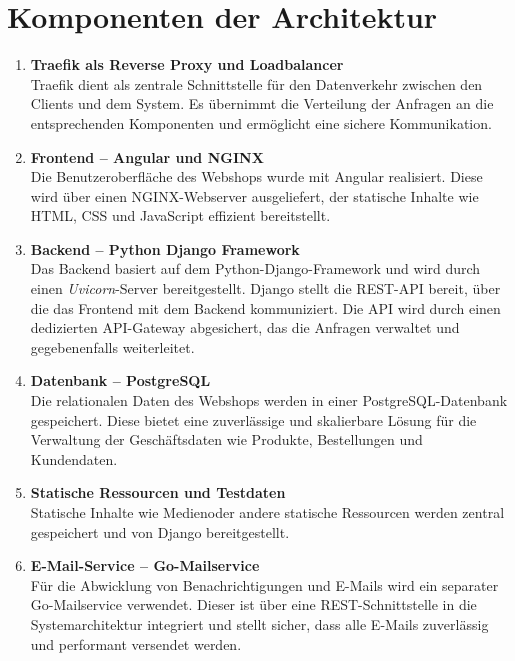 \documentclass[%
	12pt,
	a4paper,
	oneside,
	parskip=full
]{scrbook}
\begin{document}
\section{Komponenten der Architektur}
\begin{enumerate}
	\item \textbf{Traefik als Reverse Proxy und Loadbalancer} \\
	Traefik dient als zentrale Schnittstelle für den Datenverkehr zwischen den Clients und dem System. Es übernimmt die Verteilung der Anfragen an die entsprechenden Komponenten und ermöglicht eine sichere Kommunikation.
	
	\item \textbf{Frontend -- Angular und NGINX} \\
	Die Benutzeroberfläche des Webshops wurde mit Angular realisiert. Diese wird über einen NGINX-Webserver ausgeliefert, der statische Inhalte wie HTML, CSS und JavaScript effizient bereitstellt.
	
	\item \textbf{Backend -- Python Django Framework} \\
	Das Backend basiert auf dem Python-Django-Framework und wird durch einen \textit{Uvicorn}-Server bereitgestellt. Django stellt die REST-API bereit, über die das Frontend mit dem Backend kommuniziert. Die API wird durch einen dedizierten API-Gateway abgesichert, das die Anfragen verwaltet und gegebenenfalls weiterleitet.
	
	\item \textbf{Datenbank -- PostgreSQL} \\
	Die relationalen Daten des Webshops werden in einer PostgreSQL-Datenbank gespeichert. Diese bietet eine zuverlässige und skalierbare Lösung für die Verwaltung der Geschäftsdaten wie Produkte, Bestellungen und Kundendaten.
	
	\item \textbf{Statische Ressourcen und Testdaten} \\
	Statische Inhalte wie Medienoder andere statische Ressourcen werden zentral gespeichert und von Django bereitgestellt.
	
	\item \textbf{E-Mail-Service -- Go-Mailservice} \\
	Für die Abwicklung von Benachrichtigungen und E-Mails wird ein separater Go-Mailservice verwendet. Dieser ist über eine REST-Schnittstelle in die Systemarchitektur integriert und stellt sicher, dass alle E-Mails zuverlässig und performant versendet werden.
\end{enumerate}
\end{document}
